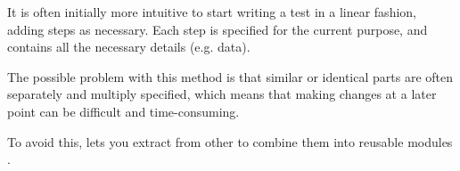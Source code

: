 
It is often initially more intuitive to start writing a test in a linear fashion, adding steps as necessary. Each step is specified for the current purpose, and contains all the necessary details (e.g. data). 

The possible problem with this method is that similar or identical parts are 
often separately and multiply specified, which means that making 
changes at a later point
can be difficult and time-consuming.

To avoid this, \app{} lets you extract \gdcases{} from other \gdcases{} to combine them into reusable modules . 

